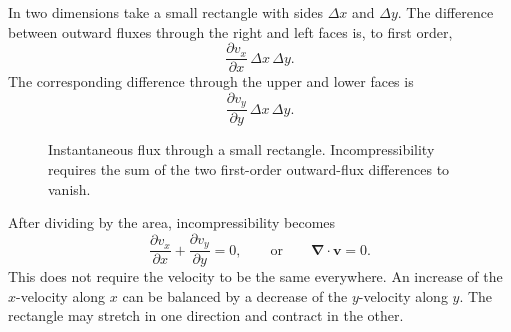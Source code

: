 In two dimensions take a small rectangle with sides \(\Delta x\) and
\(\Delta y\). The difference between outward fluxes through the right and
left faces is, to first order,
\begin{equation}
 \frac{\partial v_x}{\partial x}\,\Delta x\,\Delta y.
 \label{eq:l07-horizontal-flux}
\end{equation}
The corresponding difference through the upper and lower faces is
\begin{equation}
 \frac{\partial v_y}{\partial y}\,\Delta x\,\Delta y.
 \label{eq:l07-vertical-flux}
\end{equation}

\begin{figure}[tbp]
\centering
{}
\caption{Instantaneous flux through a small rectangle. Incompressibility
requires the sum of the two first-order outward-flux differences to vanish.}
\label{fig:l07-divergence-reconstruction}
\end{figure}

After dividing by the area, incompressibility becomes
\begin{equation}
 \frac{\partial v_x}{\partial x}
 +\frac{\partial v_y}{\partial y}=0,
 \qquad\text{or}\qquad
 \bm{\nabla}\!\cdot\!\bm v=0.
 \label{eq:l07-two-dimensional-divergence}
\end{equation}
This does not require the velocity to be the same everywhere. An increase of
the \(x\)-velocity along \(x\) can be balanced by a decrease of the
\(y\)-velocity along \(y\). The rectangle may stretch in one direction and
contract in the other.

